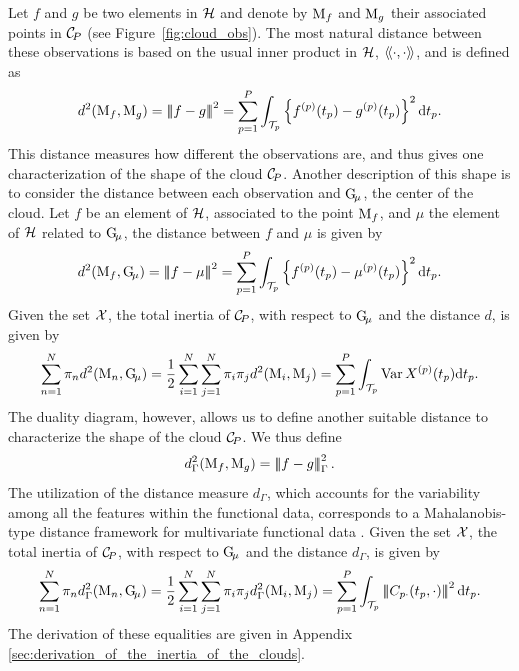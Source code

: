 Let $f$ and $g$ be two elements in $\mathcal{H}$ and denote by $\mathrm{M}_f$ and $\mathrm{M}_g$ their associated points in $\mathcal{C}_{\!P}$ (see Figure~\ref{fig:cloud_obs}). The most natural distance between these observations is based on the usual inner product in $\mathcal{H}$, $\langle\!\langle\cdot, \cdot\rangle\!\rangle$, and is defined as
\begin{equation}\label{eq:distance_obs}
    d^2(\mathrm{M}_f, \mathrm{M}_g) = \left|\!\left|\!\left|f - g\right|\!\right|\!\right|^2 = \sum_{p = 1}^P \int_{\mathcal{T}_{p}}\left\{f^{(p)}(t_p) - g^{(p)}(t_p)\right\}^2 {\rm d} t_p.
\end{equation}
This distance measures how different the observations are, and thus gives one characterization of the shape of the cloud $\mathcal{C}_{\!P}$. Another description of this shape is to consider the distance between each observation and $\mathrm{G}_{\!\mu}$, the center of the cloud. Let $f$ be an element of $\mathcal{H}$, associated to the point $\mathrm{M}_f$, and $\mu$ the element of $\mathcal{H}$ related to $\mathrm{G}_{\!\mu}$, the distance between $f$ and $\mu$ is given by
\begin{equation}\label{eq:distance_center}
    d^2(\mathrm{M}_f, \mathrm{G}_{\!\mu}) = \left|\!\left|\!\left|f - \mu\right|\!\right|\!\right|^2 = \sum_{p = 1}^P \int_{\mathcal{T}_{p}}\left\{f^{(p)}(t_p) - \mu^{(p)}(t_p)\right\}^2 {\rm d} t_p.
\end{equation}
Given the set $\mathcal{X}$, the total inertia of $\mathcal{C}_{\!P}$, with respect to $\mathrm{G}_{\!\mu}$ and the distance $d$, is given by
\begin{equation}\label{eq:inertia}
    \sum_{n = 1}^N \pi_n d^2(\mathrm{M}_n, \mathrm{G}_{\!\mu}) = \frac{1}{2}\sum_{i = 1}^N \sum_{j = 1}^N \pi_i \pi_j d^2(\mathrm{M}_i, \mathrm{M}_j) = \sum_{p = 1}^P \int_{\mathcal{T}_{p}}\operatorname{Var}{X^{(p)}(t_p)} {\rm d} t_p.
\end{equation}
The duality diagram, however, allows us to define another suitable distance to characterize the shape of the cloud $\mathcal{C}_{\!P}$. We thus define
\begin{equation}
    d^2_\Gamma(\mathrm{M}_f, \mathrm{M}_g) = \left|\!\left|\!\left|f - g\right|\!\right|\!\right|_\Gamma^2.
\end{equation}
The utilization of the distance measure $d_\Gamma$, which accounts for the variability among all the features within the functional data, corresponds to a Mahalanobis-type distance framework for multivariate functional data \cite[see][]{berrenderoMahalanobisDistanceFunctional2020,martinoKmeansProcedureBased2019}.
Given the set $\mathcal{X}$, the total inertia of $\mathcal{C}_{\!P}$, with respect to $\mathrm{G}_{\!\mu}$ and the distance $d_\Gamma$, is given by
\begin{equation}\label{eq:inertia_CP}
    \sum_{n = 1}^N \pi_n d_\Gamma^2(\mathrm{M}_n, \mathrm{G}_{\!\mu}) = \frac{1}{2}\sum_{i = 1}^N \sum_{j = 1}^N \pi_i \pi_j d_\Gamma^2(\mathrm{M}_i, \mathrm{M}_j) = \sum_{p = 1}^P \int_{\mathcal{T}_{p}} \left|\!\left|\!\left|C_{p \cdot}(t_p, \cdot)\right|\!\right|\!\right|^2 {\rm d} t_p.
\end{equation}
The derivation of these equalities are given in Appendix \ref{sec:derivation_of_the_inertia_of_the_clouds}.

